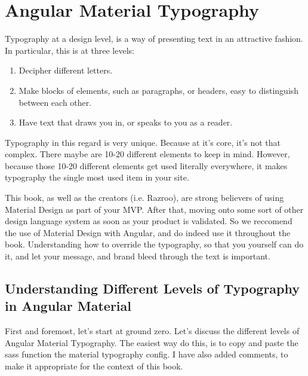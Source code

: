 \chapter{ Angular Material Typography }

Typography at a design level, is a way of presenting text in an attractive 
fashion. In particular, this is at three levels: 
\begin{enumerate}
  \item Decipher different letters.
  \item Make blocks of elements, such as paragraphs, or headers, easy to 
  distinguish between each other. 
  \item Have text that draws you in, or speaks to you as a reader. 
\end{enumerate}

Typography in this regard is very unique. Because at it's core, it's 
not that complex. There maybe are 10-20 different elements to keep in
mind. However, because those 10-20 different elements get used literally 
everywhere, it makes typography the single most used item in your site. 

This book, as well as the creators (i.e. Razroo), are strong believers of 
using Material Design as part of your MVP. After that, moving onto some sort 
of other design language system as soon as your product is validated. So 
we reccomend the use of Material Design with Angular, and do indeed use it
throughout the book. Understanding how to override the typography, so that
you yourself can do it, and let your message, and brand bleed through the 
text is important. 

\section{Understanding Different Levels of Typography in Angular Material}
First and foremost, let's start at ground zero. Let's discuss the different 
levels of Angular Material Typography. The easiest way do this, is to copy 
and paste the sass function the material typography config. I have also 
added comments, to make it appropriate for the context of this book.

